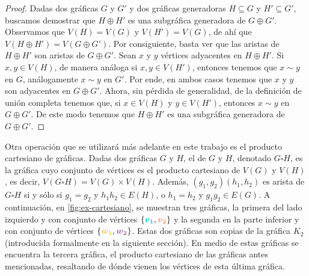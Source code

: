 \begin{proof}
    Dadas dos gr\'aficas $G$ y $G'$ y dos gr\'aficas generadoras $H \subseteq G$
    y $H'\subseteq G'$, buscamos demostrar que $H \oplus H'$ es una subgr\'afica
    generadora de $G \oplus G'$. Observamos que $V(H)=V(G)$ y $V(H')=V(G)$, de
    ah\'i que $V(H \oplus H')=V(G \oplus G')$. Por consiguiente, basta ver que
    las aristas de $H \oplus H'$ son aristas de $G \oplus G'$. Sean $x$ y $y$
    v\'ertices adyacentes en $H \oplus H'$. Si $x,y \in V(H)$, de manera
    an\'aloga si $x,y \in V(H')$, entonces tenemos que $x \sim y$ en $G$,
    an\'alogamente $x \sim y$ en $G'$. Por ende, en ambos casos tenemos que $x$
    y $y$ son adyacentes en $G \oplus G'$. Ahora, sin p\'erdida de generalidad,
    de la definici\'on de  uni\'on completa tenemos que, si $x \in V(H)$ y $y
    \in V(H')$, entonces $x \sim y$ en $G \oplus G'$. De este modo tenemos que
    $H \oplus H'$ es una subgr\'afica generadora de $G \oplus G'$.
\end{proof}

Otra operaci\'on que se utilizar\'a m\'as adelante en este trabajo es el
producto cartesiano de gr\'aficas. Dadas dos gr\'aficas $G$ y $H$, el
 de $G$ y $H$, denotado $G \square H$, es la
gr\'afica cuyo conjunto de v\'ertices es el producto cartesiano de $V(G)$ y
$V(H)$, es decir, $V(G \square H) = V(G) \times V(H)$. Adem\'as,
$(g_1,g_2)(h_1,h_2)$ es arista de $G \square H$ si y s\'olo si $g_1 = g_2$ y
$h_1h_2 \in E(H)$, o $h_1 = h_2$ y $g_1g_2 \in E(G)$. A continuaci\'on, en
\cref{fig:ex-cartesiano}, se muestran tres gr\'aficas, la primera del lado
izquierdo y con conjunto de v\'ertices $\{{\color{azulCielo}\boldsymbol{{v_1}}},
{\color{coral}\boldsymbol{{v_2}}}\}$ y la segunda en la parte inferior y con
conjunto de v\'ertices
$\{{\color{amarillo}\boldsymbol{{w_1}}},{\color{morado}\boldsymbol{{w_2}}}\}$.
Estas dos gr\'aficas son copias de la gr\'afica $K_2$ (introducida formalmente
en la siguiente secci\'on). En medio de estas gr\'aficas se encuentra la tercera
gr\'afica, el producto cartesiano de las gr\'aficas antes mencionadas,
resaltando de d\'onde vienen los v\'ertices de esta \'ultima gr\'afica.

